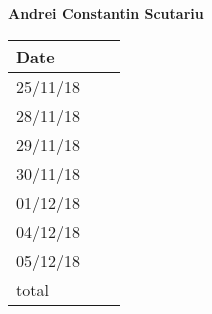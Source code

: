 \documentclass[../main.tex]{subfiles}
\begin{document}
\begin{center}
{\bf Andrei Constantin Scutariu}
	\vspace{2mm}

		\begin{tabular}{p{1.3cm}|p{1.8cm}|p{6.7cm}}
			\hline
			\bf Date & \bf \makebox[1.8cm][c]{Hours} & \bf \makebox[6.7cm][c]{Description} \\
			\hline
			25/11/18 & \makebox[1.8cm][c]{0.5h} & \makebox[6.7cm][c]{Initial Structure}\\
			28/11/18 & \makebox[1.8cm][c]{0.5h} & \makebox[6.7cm][c]{Introduction}\\
			29/11/18 & \makebox[1.8cm][c]{2h} & \makebox[6.7cm][c]{Component view}\\
			30/11/18 & \makebox[1.8cm][c]{1h} & \makebox[6.7cm][c]{Component view}\\
			01/12/18 & \makebox[1.8cm][c]{1h} & \makebox[6.7cm][c]{Requirements traceability}\\
			04/12/18 & \makebox[1.8cm][c]{2h} & \makebox[6.7cm][c]{Reviewing}\\
			05/12/18 & \makebox[1.8cm][c]{2h} & \makebox[6.7cm][c]{Architectural styles and patterns}\\
			total    & \makebox[1.8cm][c]{7h}
		\end{tabular}
\end{center}
\vspace{1cm}
\end{document}
